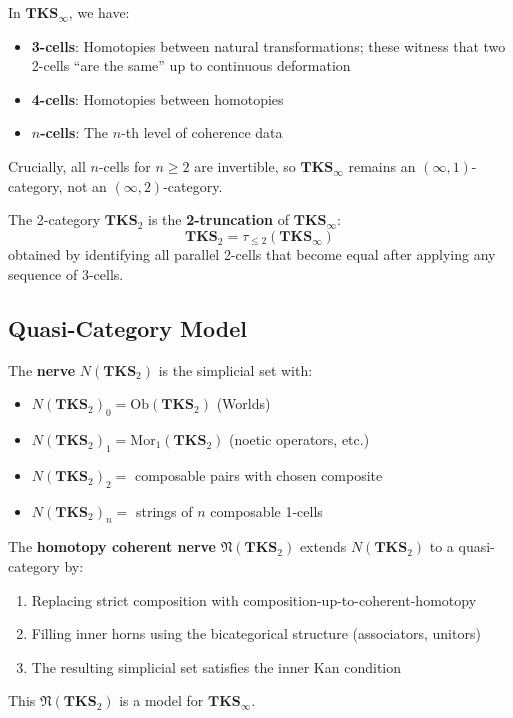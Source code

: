 \begin{definition}
\label{def:higher-noetic-morphisms}
In $\mathbf{TKS}_\infty$, we have:
\begin{itemize}
  \item \textbf{3-cells}: Homotopies between natural transformations; these
        witness that two 2-cells ``are the same'' up to continuous deformation
  \item \textbf{4-cells}: Homotopies between homotopies
  \item \textbf{$n$-cells}: The $n$-th level of coherence data
\end{itemize}
Crucially, all $n$-cells for $n \geq 2$ are invertible, so $\mathbf{TKS}_\infty$
remains an $(\infty, 1)$-category, not an $(\infty, 2)$-category.
\end{definition}

\begin{proposition}[Truncation]
\label{prop:truncation}
The 2-category $\mathbf{TKS}_2$ is the \textbf{2-truncation} of $\mathbf{TKS}_\infty$:
\[
  \mathbf{TKS}_2 = \tau_{\leq 2}(\mathbf{TKS}_\infty)
\]
obtained by identifying all parallel 2-cells that become equal after applying
any sequence of 3-cells.
\end{proposition}

\subsection{Quasi-Category Model}
\label{subsec:quasi-cat-model}

\begin{definition}
\label{def:nerve-tks}
The \textbf{nerve} $N(\mathbf{TKS}_2)$ is the simplicial set with:
\begin{itemize}
  \item $N(\mathbf{TKS}_2)_0 = \mathrm{Ob}(\mathbf{TKS}_2)$ (Worlds)
  \item $N(\mathbf{TKS}_2)_1 = \mathrm{Mor}_1(\mathbf{TKS}_2)$ (noetic operators, etc.)
  \item $N(\mathbf{TKS}_2)_2 = $ composable pairs with chosen composite
  \item $N(\mathbf{TKS}_2)_n = $ strings of $n$ composable 1-cells
\end{itemize}
\end{definition}

\begin{definition}
\label{def:homotopy-coherent-nerve}
The \textbf{homotopy coherent nerve} $\mathfrak{N}(\mathbf{TKS}_2)$ extends
$N(\mathbf{TKS}_2)$ to a quasi-category by:
\begin{enumerate}
  \item Replacing strict composition with composition-up-to-coherent-homotopy
  \item Filling inner horns using the bicategorical structure (associators, unitors)
  \item The resulting simplicial set satisfies the inner Kan condition
\end{enumerate}
This $\mathfrak{N}(\mathbf{TKS}_2)$ is a model for $\mathbf{TKS}_\infty$.
\end{definition}


